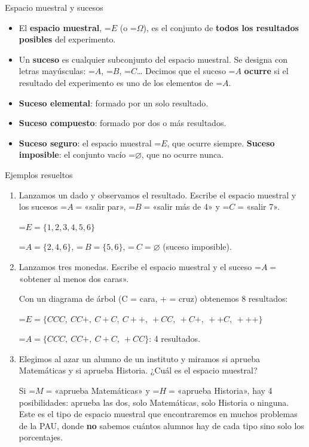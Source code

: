 \documentclass[11pt,a4paper]{article}
\newcommand{\fmm}[1]{\setbox0=\hbox{$#1$}\ifdim\wd0>\linewidth\[#1\]\else\mbox{\box0}\fi}
\begin{document}
  
\begin{fmdef}{Espacio muestral y sucesos}
\begin{itemize}
\item El \textbf{espacio muestral}, \fmm{E} (o \fmm{\Omega}), es el conjunto de \textbf{todos los resultados posibles} del experimento.
\item Un \textbf{suceso} es cualquier subconjunto del espacio muestral. Se designa con letras mayúsculas: \fmm{A}, \fmm{B}, \fmm{C}\dots{} Decimos que el suceso \fmm{A} \textbf{ocurre} si el resultado del experimento es uno de los elementos de \fmm{A}.
\item \textbf{Suceso elemental}: formado por un solo resultado. 
\item \textbf{Suceso compuesto}: formado por dos o más resultados.
\item \textbf{Suceso seguro}: el espacio muestral \fmm{E}, que ocurre siempre. \textbf{Suceso imposible}: el conjunto vacío \fmm{\varnothing}, que no ocurre nunca.
\end{itemize}
\end{fmdef}

  
\begin{fmex}{Ejemplos resueltos}
\begin{enumerate}[label=\textbf{\arabic*.},leftmargin=*]
\item Lanzamos un dado y observamos el resultado. Escribe el espacio muestral y los sucesos \fmm{A=}«salir par», \fmm{B=}«salir más de 4» y \fmm{C=}«salir 7».
          

            

\fmm{E=\{1,2,3,4,5,6\}}

            

\fmm{A=\{2,4,6\}}, \fmm{\ B=\{5,6\}}, \fmm{\ C=\varnothing} (suceso imposible).
\item Lanzamos tres monedas. Escribe el espacio muestral y el suceso \fmm{A=}«obtener al menos dos caras».
          

            

Con un diagrama de árbol (C = cara, + = cruz) obtenemos 8 resultados:

              

\fmm{E=\{CCC,\ CC{+},\ C{+}C,\ C{+}{+},\ {+}CC,\ {+}C{+},\ {+}{+}C,\ {+}{+}{+}\}}

            

\fmm{A=\{CCC,\ CC{+},\ C{+}C,\ {+}CC\}}: 4 resultados.
\item Elegimos al azar un alumno de un instituto y miramos si aprueba Matemáticas y si aprueba Historia. ¿Cuál es el espacio muestral?
          

            

Si \fmm{M=}«aprueba Matemáticas» y \fmm{H=}«aprueba Historia», hay 4 posibilidades: aprueba las dos, solo Matemáticas, solo Historia o ninguna. Este es el tipo de espacio muestral que encontraremos en muchos problemas de la PAU, donde \textbf{no} sabemos cuántos alumnos hay de cada tipo sino solo los porcentajes.
\end{enumerate}
\end{fmex}
\end{document}
